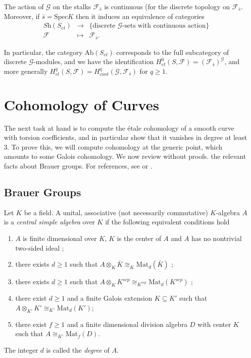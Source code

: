 \begin{theorem}
The action of $\mathcal{G}$ on the stalks $\mathcal{F}_{\bar s}$ is continuous (for the discrete topology on $\mathcal{F}_{\bar s}$. Moreover, if $\bar s= \text{Spec} K$ then it induces an equivalence of categories
$$
\begin{array}{rcl}
\textit{Sh}(S_{et}) & \longrightarrow & \{ \text{discrete $\mathcal{G}$-sets with continuous action} \} \\
\mathcal{F} & \longmapsto & \mathcal{F}_{\bar s}.
\end{array}
$$
\end{theorem}

In particular, the category $\text{Ab}(S_{et})$ corresponds to the full subcategory of discrete $\mathcal{G}$-modules, and we have the identification $H_{et}^0(S,\mathcal{F}) = (\mathcal{F}_{\bar s})^\mathcal{G}$, and more generally $H_{et}^q(S,\mathcal{F}) = H_{cont}^q (\mathcal{G}, \mathcal{F}_{\bar s})$ for $q \geq 1$.
\section{Cohomology of Curves}

The next task at hand is to compute the \'etale cohomology of a smooth curve with torsion coefficients, and in particular show that it vanishes in degree at least 3. To prove this, we will compute cohomology at the generic point, which amounts to some Galois cohomology. We now review without proofs. the relevant facts about Brauer groups. For references, see \cite{SerreAlgebra} or \cite{WeilNumberTheory}.

\subsection{Brauer Groups}

\begin{theorem} \label{defthm:CSA}
Let $K$ be a field. A unital, associative (not necessarily commutative) $K$-algebra $A$ is a \emph{central simple algebra} over $K$ if the following equivalent conditions hold
\begin{enumerate}
\item
$A$ is finite dimensional over $K$, $K$ is the center of $A$ and $A$ has no nontrivial two-sided ideal ;
\item
there exists $d \geq 1$ such that $A \otimes_K \bar K \cong_{\bar K} \text{Mat}_d(\bar K)$ ;
\item
there exists $d \geq 1$ such that $A \otimes_K K^{sep} \cong_{K^{sep}} \text{Mat}_d(K^{sep})$ ;
\item
there exist $d \geq 1$ and a finite Galois extension $K \subseteq K'$ such that $A \otimes_{K'} K' \cong_{K'} \text{Mat}_d(K')$; 
\item
there exist $f \geq 1$ and a finite dimensional division algebra $D$ with center $K$ such that $A \cong_{K'} \text{Mat}_f(D)$.
\end{enumerate}
The integer $d$ is called the \emph{degree} of $A$. 
\end{theorem}

